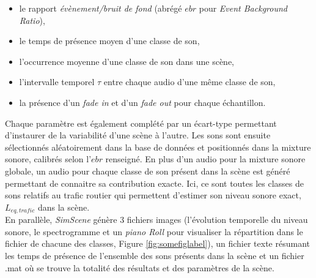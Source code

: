 \begin{itemize}
\item le rapport \textit{évènement/bruit de fond} (abrégé $ebr$ pour \textit{Event Background Ratio}),
\item le temps de présence moyen d'une classe de son,
\item l'occurrence moyenne d'une classe de son dans une scène,
\item l'intervalle temporel $\tau$ entre chaque audio d'une même classe de son,
\item la présence d'un \textit{fade in} et d'un \textit{fade out} pour chaque échantillon.\\
\end{itemize}


Chaque paramètre est également complété par un écart-type permettant d'instaurer de la variabilité d'une scène à l'autre. Les sons sont ensuite sélectionnés aléatoirement dans la base de données et positionnés dans la mixture sonore, calibrés selon l'$ebr$ renseigné. En plus d'un audio pour la mixture sonore globale, un audio pour chaque classe de son présent dans la scène est généré permettant de connaitre sa contribution exacte. Ici, ce sont toutes les classes de sons relatifs au trafic routier qui permettent d'estimer son niveau sonore exact, $L_{eq,trafic}$ dans la scène.\\

En parallèle, \textit{SimScene} génère 3 fichiers images (l'évolution temporelle du niveau sonore, le spectrogramme et un \textit{piano Roll} pour visualiser la répartition dans le fichier de chacune des classes, Figure \ref{fig:somefiglabel}), un fichier texte résumant les temps de présence de l'ensemble des sons présents dans la scène et un fichier .mat où se trouve la totalité des résultats et des paramètres de la scène.\\


